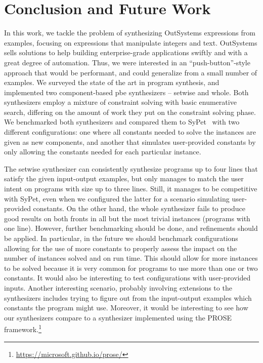 \chapter{Conclusion and Future Work}
\label{chap:conclusion}

In this work, we tackle the problem of synthesizing OutSystems expressions from
examples, focusing on expressions that manipulate integers and text.
OutSystems sells solutions to help building enterprise-grade applications
swiftly and with a great degree of automation.
Thus, we were interested in an ``push-button''-style approach that would be
performant, and could generalize from a small number of examples.
We surveyed the state of the art in program synthesis, and implemented two
component-based \gls{pbe} synthesizers -- setwise and whole.
Both synthesizers employ a mixture of constraint solving with basic enumerative
search, differing on the amount of work they put on the constraint solving
phase.
We benchmarked both synthesizers and compared them to SyPet~\cite{Feng:2017:CSC}
with two different configurations: one where all constants needed to solve the
instances are given as new components, and another that simulates
user-provided constants by only allowing the constants needed for each
particular instance.

The setwise synthesizer can consistently synthesize programs up to four lines
that satisfy the given input-output examples, but only manages to match the user
intent on programs with size up to three lines.
Still, it manages to be competitive with SyPet, even when we configured the
latter for a scenario simulating user-provided constants.
On the other hand, the whole synthesizer fails to produce good results on both
fronts in all but the most trivial instances (programs with one line).
However, further benchmarking should be done, and refinements should be applied.
In particular, in the future we should benchmark configurations allowing for the
use of more constants to properly assess the impact on the number of instances
solved and on run time.
This should allow for more instances to be solved because it is very common for
programs to use more than one or two constants.
It would also be interesting to test configurations with user-provided inputs.
Another interesting scenario, probably involving extensions to the synthesizers
includes trying to figure out from the input-output examples which constants the
program might use.
Moreover, it would be interesting to see how our synthesizers compare to a
synthesizer implemented using the PROSE
framework.\footnote{\url{https://microsoft.github.io/prose/}}

